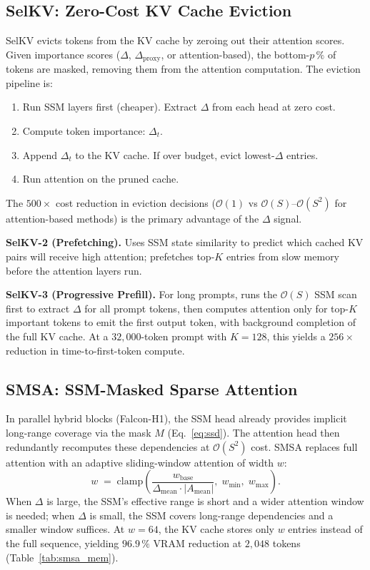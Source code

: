 \documentclass[11pt]{article}
\newcommand{\dsig}{\Delta}
\newcommand{\proxydsig}{\ensuremath{\dsig_{\mathrm{proxy}}}}
\newcommand{\Order}{\mathcal{O}}
\begin{document}
\subsection{SelKV: Zero-Cost KV Cache Eviction}
SelKV evicts tokens from the KV cache by zeroing out their attention scores.
Given importance scores ($\dsig$, $\proxydsig$, or attention-based), the
bottom-$p\,\%$ of tokens are masked, removing them from the attention
computation. The eviction pipeline is:
\begin{enumerate}[leftmargin=1.4em,itemsep=1pt,topsep=1pt]
  \item Run SSM layers first (cheaper). Extract $\dsig$ from each head at zero cost.
  \item Compute token importance: $\dsig_t$.
  \item Append $\dsig_t$ to the KV cache. If over budget, evict lowest-$\dsig$ entries.
  \item Run attention on the pruned cache.
\end{enumerate}
The $500\!\times$ cost reduction in eviction decisions ($\Order(1)$ vs
$\Order(S)$--$\Order(S^2)$ for attention-based methods) is the primary
advantage of the $\dsig$ signal.

\noindent\textbf{SelKV-2 (Prefetching).} Uses SSM state similarity to predict
which cached KV pairs will receive high attention; prefetches top-$K$ entries
from slow memory before the attention layers run.

\noindent\textbf{SelKV-3 (Progressive Prefill).} For long prompts, runs the
$\Order(S)$ SSM scan first to extract $\dsig$ for all prompt tokens, then
computes attention only for top-$K$ important tokens to emit the first
output token, with background completion of the full KV cache. At a
$32{,}000$-token prompt with $K{=}128$, this yields a $256\!\times$
reduction in time-to-first-token compute.

\subsection{SMSA: SSM-Masked Sparse Attention}
In parallel hybrid blocks (Falcon-H1), the SSM head already provides
implicit long-range coverage via the mask $M$ (Eq.~\ref{eq:ssd}). The
attention head then redundantly recomputes these dependencies at
$\Order(S^2)$ cost. SMSA replaces full attention with an adaptive
sliding-window attention of width $w$:
\begin{equation}\label{eq:smsa_width}
  w \;=\; \mathrm{clamp}\!\left(\frac{w_{\mathrm{base}}}{\dsig_{\mathrm{mean}} \cdot |A_{\mathrm{mean}}|},\; w_{\min},\; w_{\max}\right).
\end{equation}
When $\dsig$ is large, the SSM's effective range is short and a wider
attention window is needed; when $\dsig$ is small, the SSM covers long-range
dependencies and a smaller window suffices. At $w{=}64$, the KV cache
stores only $w$ entries instead of the full sequence, yielding $96.9\,\%$
VRAM reduction at $2{,}048$ tokens (Table~\ref{tab:smsa_mem}).
\end{document}
